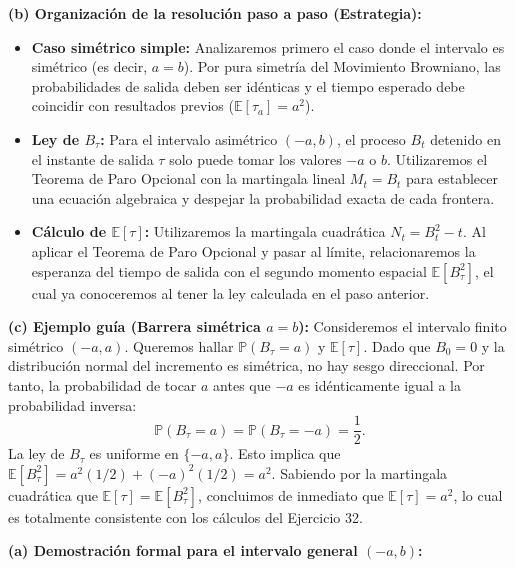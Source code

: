 \documentclass[11pt, letterpaper]{article}
\begin{document}
\vspace{5mm}

\begin{solucion}
    \textbf{(b) Organización de la resolución paso a paso (Estrategia):}
    \begin{itemize}
        \item[(i)] \textbf{Caso simétrico simple:} Analizaremos primero el caso donde el intervalo es simétrico (es decir, $a=b$). Por pura simetría del Movimiento Browniano, las probabilidades de salida deben ser idénticas y el tiempo esperado debe coincidir con resultados previos ($\mathbb{E}[\tau_a] = a^2$).
        \item[(ii)] \textbf{Ley de $B_\tau$:} Para el intervalo asimétrico $(-a, b)$, el proceso $B_t$ detenido en el instante de salida $\tau$ solo puede tomar los valores $-a$ o $b$. Utilizaremos el Teorema de Paro Opcional con la martingala lineal $M_t = B_t$ para establecer una ecuación algebraica y despejar la probabilidad exacta de cada frontera.
        \item[(iii)] \textbf{Cálculo de $\mathbb{E}[\tau]$:} Utilizaremos la martingala cuadrática $N_t = B_t^2 - t$. Al aplicar el Teorema de Paro Opcional y pasar al límite, relacionaremos la esperanza del tiempo de salida con el segundo momento espacial $\mathbb{E}[B_\tau^2]$, el cual ya conoceremos al tener la ley calculada en el paso anterior.
    \end{itemize}

    \vspace{3mm}
    \textbf{(c) Ejemplo guía (Barrera simétrica $a=b$):}
    Consideremos el intervalo finito simétrico $(-a, a)$. Queremos hallar $\mathbb{P}(B_\tau = a)$ y $\mathbb{E}[\tau]$.
    Dado que $B_0 = 0$ y la distribución normal del incremento es simétrica, no hay sesgo direccional. Por tanto, la probabilidad de tocar $a$ antes que $-a$ es idénticamente igual a la probabilidad inversa:
    \[ \mathbb{P}(B_\tau = a) = \mathbb{P}(B_\tau = -a) = \frac{1}{2}. \]
    La ley de $B_\tau$ es uniforme en $\{-a, a\}$. Esto implica que $\mathbb{E}[B_\tau^2] = a^2(1/2) + (-a)^2(1/2) = a^2$.
    Sabiendo por la martingala cuadrática que $\mathbb{E}[\tau] = \mathbb{E}[B_\tau^2]$, concluimos de inmediato que $\mathbb{E}[\tau] = a^2$, lo cual es totalmente consistente con los cálculos del Ejercicio 32.

    \vspace{3mm}
    \textbf{(a) Demostración formal para el intervalo general $(-a, b)$:}


\end{solucion}
\end{document}
